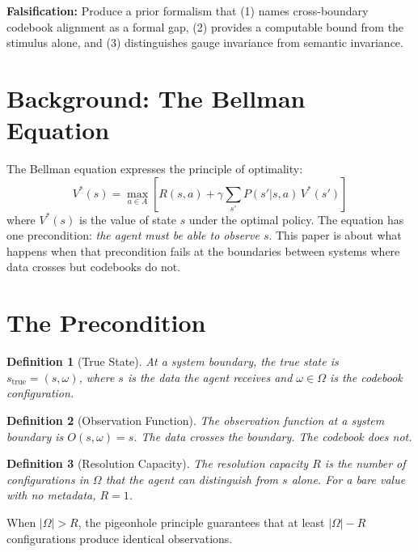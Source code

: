 \documentclass[11pt,a4paper]{article}
\newtheorem{definition}{Definition}
\begin{document}
\textbf{Falsification:} Produce a prior formalism that (1) names 
cross-boundary codebook alignment as a formal gap, (2) provides a 
computable bound from the stimulus alone, and (3) distinguishes gauge 
invariance from semantic invariance.


\section{Background: The Bellman Equation}

The Bellman equation expresses the principle of optimality:
\[
V^*(s) = \max_{a \in A} \left[ R(s, a) + \gamma \sum_{s'} 
P(s' | s, a)\, V^*(s') \right]
\]
where $V^*(s)$ is the value of state $s$ under the optimal policy. 
The equation has one precondition: \emph{the agent must be able to 
observe $s$}. This paper is about what happens when that precondition 
fails at the boundaries between systems where data crosses but 
codebooks do not.


\section{The Precondition}

\begin{definition}[True State]
At a system boundary, the true state is $s_{\mathrm{true}} = (s, \omega)$, 
where $s$ is the data the agent receives and $\omega \in \Omega$ is the 
codebook configuration.
\end{definition}

\begin{definition}[Observation Function]
The observation function at a system boundary is $O(s, \omega) = s$. 
The data crosses the boundary. The codebook does not.
\end{definition}

\begin{definition}[Resolution Capacity]
The resolution capacity $R$ is the number of configurations in $\Omega$ 
that the agent can distinguish from $s$ alone. For a bare value with no 
metadata, $R = 1$.
\end{definition}

\noindent When $|\Omega| > R$, the pigeonhole principle guarantees that 
at least $|\Omega| - R$ configurations produce identical observations.
\end{document}
